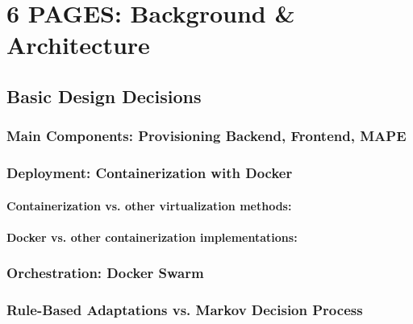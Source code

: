 \documentclass{seal_thesis}
\begin{document}
\chapter{6 PAGES: Background \& Architecture}

\section{Basic Design Decisions}

\subsection{Main Components: Provisioning Backend, Frontend, MAPE}

\subsection{Deployment: Containerization with Docker}
\subsubsection{Containerization vs. other virtualization methods:}
\subsubsection{Docker vs. other containerization implementations:}

\subsection{Orchestration: Docker Swarm}

\subsection{Rule-Based Adaptations vs. Markov Decision Process}
\end{document}
